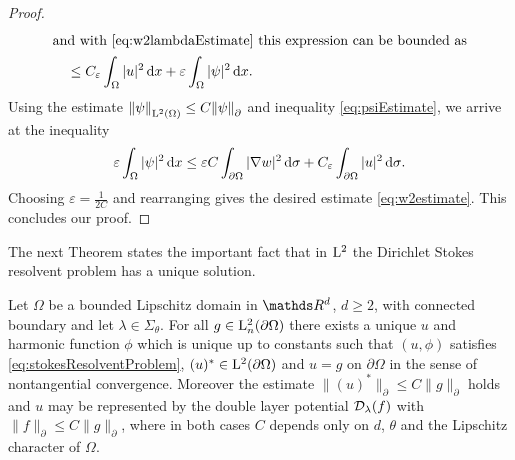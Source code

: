 \begin{proof}
\begin{align*}
    \intertext{and with \eqref{eq:w2lambdaEstimate} this expression can be bounded as}
    &\quad \leq  C_\varepsilon \int_\Omega |u|^2 \, {\operatorname{d}\!{x}} + \varepsilon \int_\Omega |\psi|^2 \, {\operatorname{d}\!{x}}.
  \end{align*}
  Using the estimate $\|\psi\|^{}_{\mathrm{L}^2(\Omega)} \leq C \|\psi\|^{}_\partial$ and inequality \eqref{eq:psiEstimate}, we arrive at the inequality
  \begin{align*}
    \varepsilon \int_\Omega |\psi|^2 \, {\operatorname{d}\!{x}} \leq \varepsilon C \int_{\partial\Omega} |\nabla w|^2 \, {\operatorname{d}\!{\sigma}} + C_\varepsilon \int_{\partial\Omega} |u|^2 \, {\operatorname{d}\!{\sigma}}.
  \end{align*}
  Choosing $\varepsilon = \frac{1}{2 C}$ and rearranging gives the desired estimate 
  \eqref{eq:w2estimate}.
  This concludes our proof.
\end{proof}

The next Theorem states the important fact that in $\mathrm{L}^2$ the Dirichlet Stokes resolvent problem has a unique solution.

\begin{thm}
  \label{thm:exAndUniqueSolution}
  Let $\Omega$ be a bounded Lipschitz domain in $\R^d$, $d \geq 2$, with connected boundary and let $\lambda \in \Sigma_\theta$.
  For all $g \in \mathrm{L}^2_n(\partial\Omega)$ there exists a unique $u$ and harmonic function $\phi$ which is unique up to constants such that $(u,\phi)$ satisfies \eqref{eq:stokesResolventProblem}, $(u)^* \in \mathrm{L}^2(\partial\Omega)$ and $u = g$ on $\partial\Omega$ in the sense of nontangential convergence.
  Moreover the estimate $ \| (u)^* \|_\partial \leq C \| g\|_\partial$ holds and $u$ may be represented by the double layer potential $\mathcal{D}_\lambda(f)$ with $\|f\|_\partial \leq C \|g\|_\partial$, where in both cases $C$ depends only on $d$, $\theta$ and the Lipschitz character of $\Omega$.
\end{thm}

